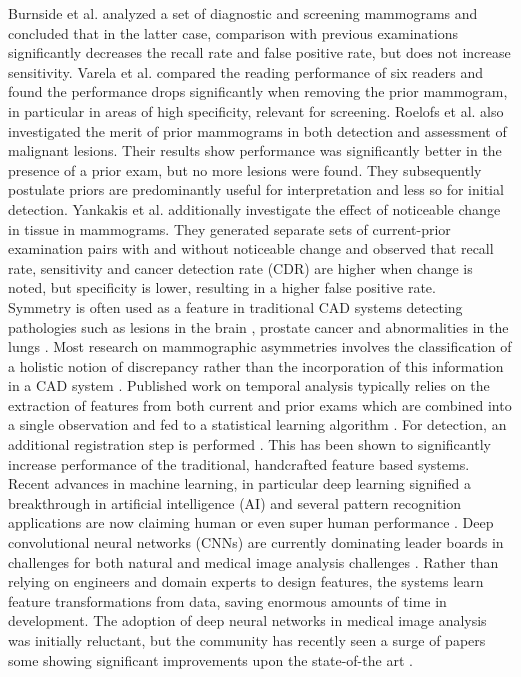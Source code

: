 \documentclass[12pt]{spieman}  %
\begin{document}
Burnside et al. \cite{Burn02} analyzed a set of diagnostic and screening mammograms and concluded that in the latter case, comparison with previous examinations significantly decreases the recall rate and false positive rate, but does not increase sensitivity. Varela et al. \cite{Vare05} compared the reading performance of six readers and found the performance drops significantly when removing the prior mammogram, in particular in areas of high specificity, relevant for screening. Roelofs et al. \cite{Roel07} also investigated the merit of prior mammograms in both detection and assessment of malignant lesions. Their results show performance was significantly better in the presence of a prior exam, but no more lesions were found. They subsequently postulate priors are predominantly useful for interpretation and less so for initial detection. Yankakis et al. \cite{Yank11} additionally investigate the effect of noticeable change in tissue in mammograms. They generated separate sets of current-prior examination pairs with and without noticeable change and observed that recall rate, sensitivity and cancer detection rate (CDR) are higher when change is noted, but specificity is lower, resulting in a higher false positive rate. \\

Symmetry is often used as a feature in traditional CAD systems detecting pathologies such as lesions in the brain \cite{Lui09h}, prostate cancer \cite{Litj14c} and abnormalities in the lungs \cite{Ginn01a}. Most research on mammographic asymmetries involves the classification of a holistic notion of discrepancy rather than the incorporation of this information in a CAD system \cite{Ferr01, Cast15}. Published work on temporal analysis typically relies on the extraction of features from both current and prior exams which are combined into a single observation and fed to a statistical learning algorithm \cite{Hadj01a, Timp07}. For detection, an additional registration step is performed \cite{Timp06}. This has been shown to significantly increase performance of the traditional, handcrafted feature based systems. \\

Recent advances in machine learning, in particular deep learning \cite{Lecu98, Hint06a, Beng13, Schm15a} signified a breakthrough in artificial intelligence (AI) and several pattern recognition applications are now claiming human or even super human performance \cite{Cire12a, Mnih15, Ioff15, Silv16}. Deep convolutional neural networks (CNNs) \cite{Lecu98} are currently dominating leader boards in challenges for both natural \cite{Russ14a} and medical image analysis challenges \cite{Cire13a, Ronn15, Wang16a}. Rather than relying on engineers and domain experts to design features, the systems learn feature transformations from data, saving enormous amounts of time in development. The adoption of deep neural networks in medical image analysis was initially reluctant, but the community has recently seen a surge of papers \cite{Litj17} some showing significant improvements upon the state-of-the art \cite{Roth16, Kooi16, Seti16, Grin16b}. \\
\end{document}
